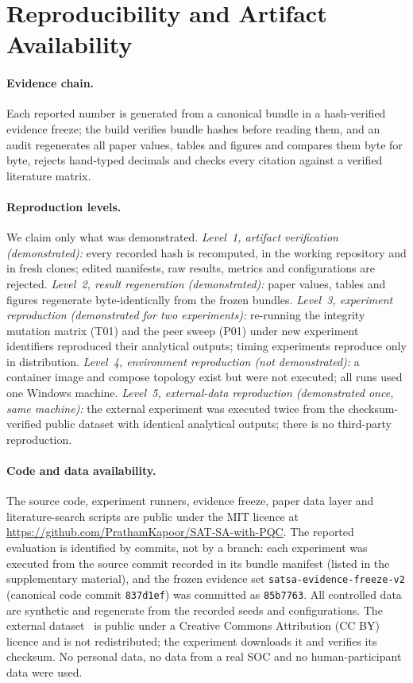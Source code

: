 \section{Reproducibility and Artifact Availability}
\label{sec:repro}

\paragraph{Evidence chain.} Each reported number is generated from a canonical bundle
in a hash-verified evidence freeze; the build verifies bundle hashes before reading
them, and an audit regenerates all paper values, tables and figures and compares them
byte for byte, rejects hand-typed decimals and checks every citation against a
verified literature matrix.

\paragraph{Reproduction levels.} We claim only what was demonstrated.
\emph{Level~1, artifact verification (demonstrated):} every recorded hash is recomputed,
in the working repository and in fresh clones; edited manifests, raw results, metrics
and configurations are rejected. \emph{Level~2, result regeneration (demonstrated):}
paper values, tables and figures regenerate byte-identically from the frozen bundles.
\emph{Level~3, experiment reproduction (demonstrated for two experiments):} re-running
the integrity mutation matrix (T01) and the peer sweep (P01) under new experiment
identifiers reproduced their analytical outputs; timing experiments reproduce only in
distribution. \emph{Level~4, environment reproduction (not demonstrated):} a container
image and compose topology exist but were not executed; all runs used one Windows
machine. \emph{Level~5, external-data reproduction (demonstrated once, same machine):}
the external experiment was executed twice from the checksum-verified public dataset
with identical analytical outputs; there is no third-party reproduction.

\paragraph{Code and data availability.} The source code, experiment runners, evidence
freeze, paper data layer and literature-search scripts are public under the MIT licence
at \url{https://github.com/PrathamKapoor/SAT-SA-with-PQC}. The reported evaluation is
identified by commits, not by a branch: each experiment was executed from the source
commit recorded in its bundle manifest (listed in the supplementary material), and the
frozen evidence set \texttt{satsa-evidence-freeze-v2} (canonical code commit
\texttt{837d1ef}) was committed as \texttt{85b7763}. All controlled data
are synthetic and regenerate from the recorded seeds and configurations. The external
dataset~\cite{amaral2018uci498} is public under a Creative Commons Attribution (CC BY) licence and is not
redistributed; the
experiment downloads it and verifies its checksum. No personal data, no data from a
real SOC and no human-participant data were used.
